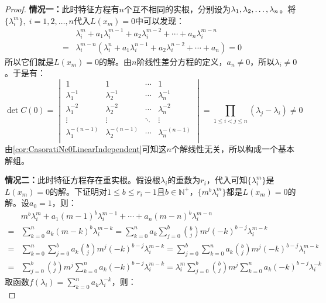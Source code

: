 \begin{proof}
	\textbf{情况一：}此时特征方程有$n$个互不相同的实根，分别设为$\lambda_1, \lambda_2, \dots, \lambda_{n}$。将$\{\lambda_i^m\},\;i=1,2,\dots,n$代入$L(x_m)=0$中可以发现：
	\begin{align*}
		&\lambda_i^m+a_1\lambda_i^{m-1}+a_2\lambda_i^{m-2}+\cdots+a_n\lambda_i^{m-n} \\
		=&\lambda_i^{m-n}(\lambda_i^n+a_1\lambda_i^{n-1}+a_2\lambda_i^{n-2}+\cdots+a_n)=0
	\end{align*}
	所以它们就是$L(x_m)=0$的解。由$n$阶线性差分方程的定义，$a_n\ne0$，所以$\lambda_i\ne0$。于是有：
	\begin{equation*}
		\det C(0)=
		\begin{vmatrix}
			1 & 1 & \cdots & 1 \\
			\lambda_1^{-1} & \lambda_2^{-1} & \cdots & \lambda_n^{-1} \\
			\lambda_1^{-2} & \lambda_2^{-2} & \cdots & \lambda_n^{-2} \\
			\vdots & \vdots & \ddots & \vdots \\
			\lambda_1^{-(n-1)} & \lambda_2^{-(n-1)} & \cdots & \lambda_n^{-(n-1)} \\
		\end{vmatrix}
		=\prod_{1\leqslant i<j\leqslant n}(\lambda_j-\lambda_i)\ne0
	\end{equation*}
	由\cref{cor:CasoratiNe0LinearIndependent}可知这$n$个解线性无关，所以构成一个基本解组。\par
	\textbf{情况二：}此时特征方程存在重实根。假设根$\lambda_i$的重数为$r_i$，代入可知$\{\lambda_i^m\}$是$L(x_m)=0$的解。下证明对$1\leqslant b\leqslant r_i-1$且$b\in\mathbb{N}^+$，$\{m^b\lambda_i^m\}$都是$L(x_m)=0$的解。设$a_0=1$，则：
	\begin{align*}
		&m^{b}\lambda_i^m+a_1(m-1)^{b}\lambda_i^{m-1}+\cdots+a_{n}(m-n)^{b}\lambda_i^{m-n} \\
		=&\sum_{k=0}^{n}a_k(m-k)^b\lambda_i^{m-k} =\sum_{k=0}^{n}a_k\sum_{j=0}^{b}\binom{b}{j}m^j(-k)^{b-j}\lambda_i^{m-k} \\
		=&\sum_{k=0}^{n}\sum_{j=0}^{b}a_k\binom{b}{j}m^j(-k)^{b-j}\lambda_i^{m-k}
		=\sum_{j=0}^{b}\sum_{k=0}^{n}a_k\binom{b}{j}m^j(-k)^{b-j}\lambda_i^{m-k} \\
		=&\sum_{j=0}^{b}\binom{b}{j}m^j\sum_{k=0}^{n}a_k(-k)^{b-j}\lambda_i^{m-k}=\lambda_i^m\sum_{j=0}^{b}\binom{b}{j}m^j\sum_{k=0}^{n}a_k(-k)^{b-j}\lambda_i^{-k}
	\end{align*}
	取函数$f(\lambda_i)=\sum\limits_{k=0}^{n}a_k\lambda_i^{-k}$，则：
	\begin{equation*}

\end{equation*}
\end{proof}
